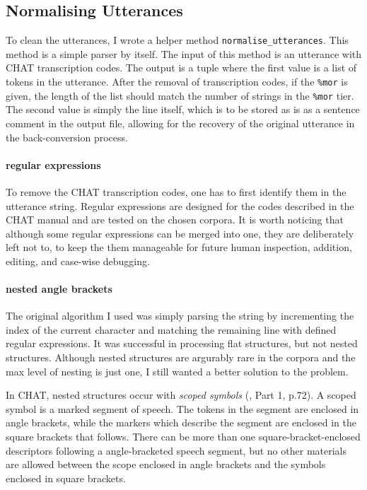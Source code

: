 \subsection{Normalising Utterances}\label{sec:normalise}

To clean the utterances, I wrote a helper method \texttt{normalise\_utterances}. This method is a simple parser by itself. The input of this method is an utterance with CHAT transcription codes. The output is a tuple where the first value is a list of tokens in the utterance. After the removal of transcription codes, if the \texttt{\%mor} is given, the length of the list should match the number of strings in the \texttt{\%mor} tier. The second value is simply the line itself, which is to be stored as is as a sentence comment  in the output file, allowing for the recovery of the original utterance in the back-conversion process.

\paragraph{regular expressions} To remove the CHAT transcription codes, one has to first identify them in the utterance string. Regular expressions are designed for the codes described in the CHAT manual and are tested on the chosen corpora. It is worth noticing that although some regular expressions can be merged into one, they are deliberately left not to, to keep the them manageable for future human inspection, addition, editing, and case-wise debugging.

\paragraph{nested angle brackets} The original algorithm I used was simply parsing the string by incrementing the index of the current character and matching the remaining line with defined regular expressions. It was successful in processing flat structures, but not nested structures. Although nested structures are argurably rare in the corpora and the max level of nesting is just one, I still wanted a better solution to the problem.

In CHAT, nested structures occur with \emph{scoped symbols} (\cite{Macwhinney2000}, Part 1, p.72). A scoped symbol is a marked segment of speech. The tokens in the segment are enclosed in angle brackets, while the markers which describe the segment are enclosed in the square brackets that follows. There can be more than one square-bracket-enclosed descriptors following a angle-bracketed speech segment, but no other materials are allowed between the scope enclosed in angle brackets and the symbols enclosed in square brackets.


